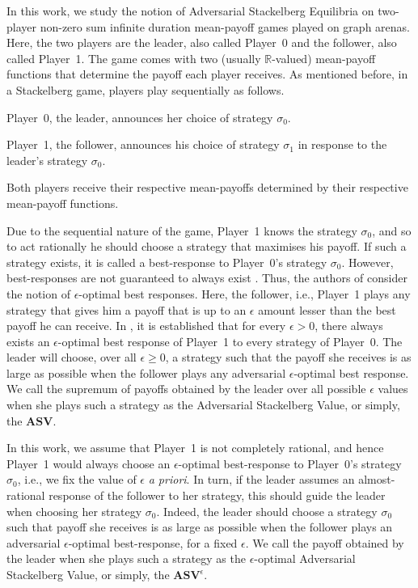 In this work, we study the notion of Adversarial Stackelberg Equilibria on two-player non-zero sum infinite duration mean-payoff games played on graph arenas. Here, the two players are the leader, also called Player~0 and the follower, also called Player~1. The game comes with two (usually $\mathbb{R}$-valued) mean-payoff functions that determine the payoff each player receives. As mentioned before, in a Stackelberg game, players play sequentially as follows.
\begin{inparaenum}[(i)]
\item Player~0, the leader, announces her choice of strategy $\sigma_0$. 
\item Player~1, the follower, announces his choice of strategy $\sigma_1$ in response to the leader's strategy $\sigma_0$. 
\item Both players receive their respective mean-payoffs determined by their respective mean-payoff functions.
\end{inparaenum}
Due to the sequential nature of the game, Player~1 knows the strategy $\sigma_0$, and so to act rationally he should choose a strategy that maximises his payoff. If such a strategy exists, it is called a best-response to Player~0's strategy $\sigma_0$. However, best-responses are not guaranteed to always exist \cite{FGR20}. Thus, the authors of \cite{FGR20} consider the notion of $\epsilon$-optimal best responses. Here, the follower, i.e., Player~1  plays any strategy that gives him a payoff that is up to an $\epsilon$ amount lesser than the best payoff he can receive. In \cite{FGR20}, it is  established that for every $\epsilon > 0$, there always exists an $\epsilon$-optimal best response of Player~1 to every strategy of Player~0. The leader will choose, over all $\epsilon \geqslant 0$, a strategy such that the payoff she receives is as large as possible when the follower plays any adversarial $\epsilon$-optimal best response. We call the supremum of payoffs obtained by the leader over all possible $\epsilon$ values when she plays such a strategy as the Adversarial Stackelberg Value, or simply, the $\mathbf{ASV}$.

In this work, we assume that Player~1 is not completely rational, and hence Player~1 would always choose an $\epsilon$-optimal best-response to Player~0's strategy $\sigma_0$, i.e., we fix the value of $\epsilon$ \emph{a priori}.
In turn, if the leader assumes an almost-rational response of the follower to her strategy, this should guide the leader when choosing her strategy $\sigma_0$. Indeed, the leader should choose a strategy $\sigma_0 $ such that payoff she receives is as large as possible when the follower plays an adversarial $\epsilon$-optimal best-response, for a fixed $\epsilon$. We call the payoff obtained by the leader when she plays such a strategy as the $\epsilon$-optimal Adversarial Stackelberg Value, or simply, the $\mathbf{ASV}^{\epsilon}$.

